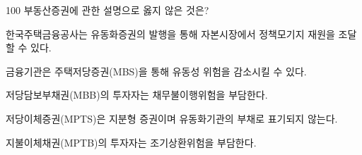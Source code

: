 \begin{question}{100}
부동산증권에 관한 설명으로 옳지 않은 것은?
\begin{choices}
  \item 한국주택금융공사는 유동화증권의 발행을 통해 자본시장에서 정책모기지 재원을 조달할 수 있다.
  \item 금융기관은 주택저당증권(MBS)을 통해 유동성 위험을 감소시킬 수 있다.
  \item 저당담보부채권(MBB)의 투자자는 채무불이행위험을 부담한다.
  \item 저당이체증권(MPTS)은 지분형 증권이며 유동화기관의 부채로 표기되지 않는다.
  \item 지불이체채권(MPTB)의 투자자는 조기상환위험을 부담한다.
\end{choices}
\end{question}

